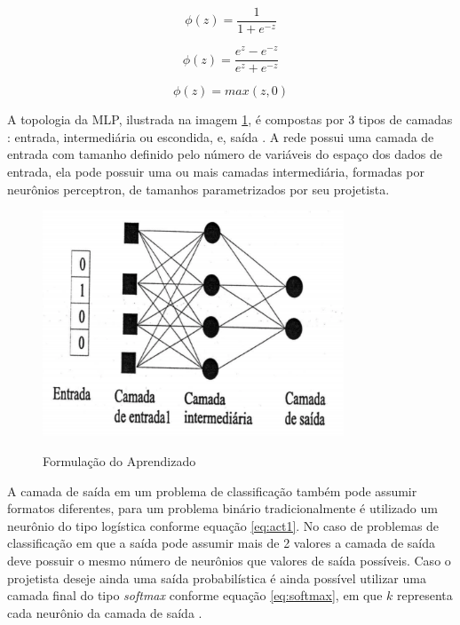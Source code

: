 \begin{equation}
\phi(z) = \frac{1}{1 + e^{-z}}
\label{eq:act1}
\end{equation}

\begin{equation}
\phi(z) = \frac{e^z - e^{-z}}{e^z + e^{-z}}
\label{eq:act2}
\end{equation}

\begin{equation}
\phi(z) = max(z, 0)
\label{eq:act3}
\end{equation}
%

A topologia da MLP, ilustrada na imagem \ref{fig:MLPDraw}, é compostas por 3 tipos de camadas : entrada, intermediária ou escondida, e, saída  \cite{Braga2007}. A rede possui uma camada de entrada com tamanho definido pelo número de variáveis do espaço dos dados de entrada, ela pode possuir uma ou mais camadas intermediária, formadas por neurônios perceptron, de tamanhos parametrizados por seu projetista. 

\begin{figure}[!htb]
	\centering
	\caption{Formulação do Aprendizado} 
	\includegraphics[width=0.8\textwidth]{./04-figuras/mlp.png} \\
	\cite{Braga2007}
	\label{fig:MLPDraw}
\end{figure}

A camada de saída em um problema de classificação também pode assumir formatos diferentes, para um problema binário tradicionalmente é utilizado um neurônio do tipo logística conforme equação \ref{eq:act1}.  No caso de problemas de classificação em que a saída pode assumir mais de 2 valores a camada de saída deve possuir o mesmo  número de neurônios que valores de saída possíveis. Caso o projetista deseje ainda uma saída probabilística é ainda possível utilizar uma camada final do tipo \textit{softmax} conforme equação \ref{eq:softmax}, em que $k$ representa cada neurônio da camada de saída \cite{Goodfellow-et-al-2016}.  


